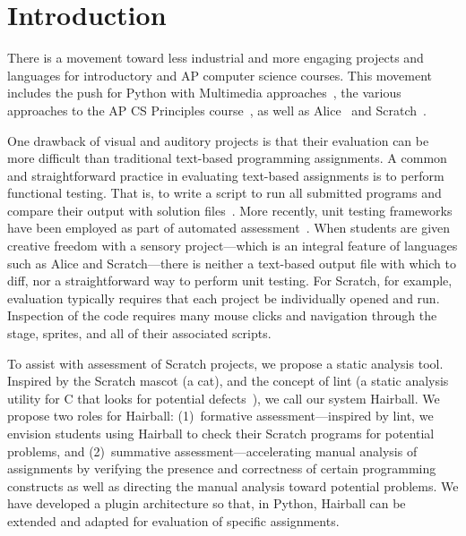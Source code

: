 \section{Introduction}
There is a movement toward less industrial and more engaging projects and
languages for introductory and AP computer science courses.  This movement
includes the push for Python with Multimedia
approaches~\cite{Adams:2012:SLP:2157136.2157319, Forte:2004:CCC:962752.962945,
Simon:2010:ERC:1822090.1822151}, the various approaches to the AP CS Principles
course~\cite{Snyder:2012:FFC:2189835.2189852}, as well as
Alice~\cite{Cooper:2003:TOI:611892.611966} and
Scratch~\cite{Maloney:2010:SPL:1868358.1868363}.

One drawback of visual and auditory projects is that their evaluation can be
more difficult than traditional text-based programming assignments.  A common
and straightforward practice in evaluating text-based assignments is to perform
functional testing. That is, to write a script to run all submitted programs
and compare their output with solution
files~\cite{Jackson:1997:GSP:268084.268210}.  More recently, unit testing
frameworks have been employed as part of automated
assessment~\cite{Spacco:2006:EMD:1140124.1140131,
  Edwards:2003:RCS:949344.949390}.  When students are given creative freedom
with a sensory project---which is an integral feature of languages such as
Alice and Scratch---there is neither a text-based output file with which to
diff, nor a straightforward way to perform unit testing.  For Scratch, for
example, evaluation typically requires that each project be individually opened
and run.  Inspection of the code requires many mouse clicks and navigation
through the stage, sprites, and all of their associated scripts.

To assist with assessment of Scratch projects, we propose a static analysis
tool.  Inspired by the Scratch mascot (a cat), and the concept of lint (a
static analysis utility for C that looks for potential
defects~\cite{Johnson78lint}), we call our system Hairball.  We propose two
roles for Hairball: (1)~formative assessment---inspired by lint, we envision
students using Hairball to check their Scratch programs for potential problems,
and (2)~summative assessment---accelerating manual analysis of assignments by
verifying the presence and correctness of certain programming constructs as
well as directing the manual analysis toward potential problems.  We have
developed a plugin architecture so that, in Python, Hairball can be extended
and adapted for evaluation of specific assignments.


